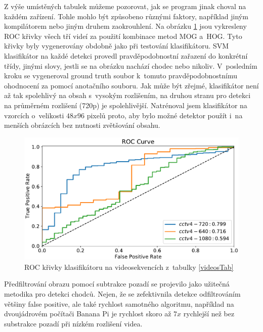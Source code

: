Z výše umístěných tabulek můžeme pozorovat, jak se program jinak choval na každém zařízení. Tohle mohlo být způsobeno různými faktory, například jiným kompilátorem nebo jiným druhem zaokrouhlení. 
Na obrázku \ref{fig:rocCurve2} jsou vykresleny ROC křivky všech tří videí za použití kombinace metod MOG a~HOG. Tyto křivky byly vygenerovány obdobně jako při testování klasifikátoru. SVM klasifikátor na každé detekci provedl pravděpodobnostní zařazení do konkrétní třídy, jinými slovy, jestli se na obrázku nachází chodec nebo nikoliv. V~posledním kroku se vygeneroval ground truth soubor k~tomuto pravděpodobnostnímu ohodnocení za pomocí anotačního souboru. Jak může být zřejmé, klasifikátor není až tak spolehlivý na obsah s~vysokým rozlišením, na druhou stranu pro detekci na průměrném rozlišení (720p) je spolehlivější. Natrénoval jsem klasifikátor na vzorcích o~velikosti $48x96$ pixelů proto, aby bylo možné detektor použít i~na menších obrázcích bez nutnosti zvětšování obsahu.   

\begin{figure}[H]
\centering
\includegraphics[width=16cm]{figures/roc2}
\caption{ROC křivky klasifikátoru na videosekvencích z~tabulky \ref{videosTab}}
\label{fig:rocCurve2}
\end{figure}

Předfiltrování obrazu pomocí subtrakce pozadí se projevilo jako užitečná metodika pro detekci chodců. Nejen, že se zefektivnila detekce odfiltrováním většiny false positive, ale také rychlost samotného algoritmu, například na dvoujádrovém počítači Banana Pi je rychlost skoro až $7x$ rychlejší než bez substrakce pozadí při nízkém rozlišení videa.  
